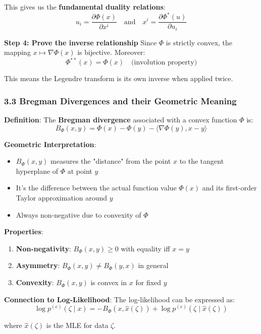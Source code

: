 \documentclass{amsart}
\theoremstyle{plain}
\theoremstyle{definition}
\theoremstyle{remark}
\begin{document}
This gives us the \textbf{fundamental duality relations}:
\[
u_i = \frac{\partial \Phi(x)}{\partial x^{i}} \quad \text{and} \quad x^{i} = \frac{\partial \Phi^{*}(u)}{\partial u_i}
\]

\textbf{Step 4: Prove the inverse relationship}
Since $\Phi$ is strictly convex, the mapping $x \mapsto \nabla \Phi(x)$ is bijective. Moreover:
\[
\Phi^{**}(x) = \Phi(x) \quad \text{(involution property)}
\]

This means the Legendre transform is its own inverse when applied twice.

\subsubsection{3.3 Bregman Divergences and their Geometric Meaning}

\textbf{Definition}: The \textbf{Bregman divergence} associated with a convex function $\Phi$ is:
\[
B_{\Phi}(x, y) = \Phi(x) - \Phi(y) - \langle \nabla \Phi(y), x - y \rangle
\]

\textbf{Geometric Interpretation}:

\begin{itemize}
	\item $B_{\Phi}(x, y)$ measures the "distance" from the point $x$ to the tangent hyperplane of $\Phi$ at point $y$
	\item It's the difference between the actual function value $\Phi(x)$ and its first-order Taylor approximation around $y$
	\item Always non-negative due to convexity of $\Phi$
\end{itemize}

\textbf{Properties}:

\begin{enumerate}
	\item \textbf{Non-negativity}: $B_{\Phi}(x, y) \geq 0$ with equality iff $x = y$
	\item \textbf{Asymmetry}: $B_{\Phi}(x, y) \neq B_{\Phi}(y, x)$ in general
	\item \textbf{Convexity}: $B_{\Phi}(x, y)$ is convex in $x$ for fixed $y$
\end{enumerate}

\textbf{Connection to Log-Likelihood}:
The log-likelihood can be expressed as:
\[
\log p^{(e)}(\zeta \mid x) = -B_{\Phi}(x, \widehat{x}(\zeta)) + \log p^{(e)}(\zeta \mid \widehat{x}(\zeta))
\]

where $\widehat{x}(\zeta)$ is the MLE for data $\zeta$.
\end{document}
